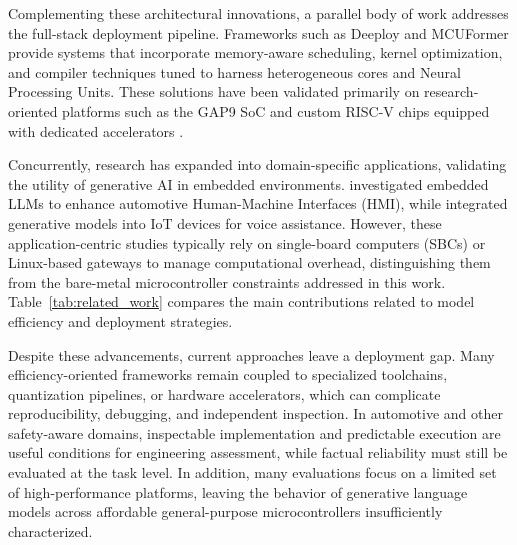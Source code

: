 \documentclass{ieeeaccess}
\begin{document}
Complementing these architectural innovations, a parallel body of work addresses the full-stack deployment pipeline. Frameworks such as Deeploy \cite{scherer2024deeploy} and MCUFormer \cite{liang2023mcuformer} provide systems that incorporate memory-aware scheduling, kernel optimization, and compiler techniques tuned to harness heterogeneous cores and Neural Processing Units. These solutions have been validated primarily on research-oriented platforms such as the GAP9 SoC \cite{BusiaTinyTransformer2025} and custom RISC-V chips equipped with dedicated accelerators \cite{scherer2024deeploy}.

Concurrently, research has expanded into domain-specific applications, validating the utility of generative AI in embedded environments. \cite{varshni2025embedded} investigated embedded LLMs to enhance automotive Human-Machine Interfaces (HMI), while \cite{yauri2024generative} integrated generative models into IoT devices for voice assistance. However, these application-centric studies typically rely on single-board computers (SBCs) or Linux-based gateways to manage computational overhead, distinguishing them from the bare-metal microcontroller constraints addressed in this work. Table~\ref{tab:related_work} compares the main contributions related to model efficiency and deployment strategies.

Despite these advancements, current approaches leave a deployment gap. Many efficiency-oriented frameworks remain coupled to specialized toolchains, quantization pipelines, or hardware accelerators, which can complicate reproducibility, debugging, and independent inspection. In automotive and other safety-aware domains, inspectable implementation and predictable execution are useful conditions for engineering assessment, while factual reliability must still be evaluated at the task level. In addition, many evaluations focus on a limited set of high-performance platforms, leaving the behavior of generative language models across affordable general-purpose microcontrollers insufficiently characterized.
\end{document}
